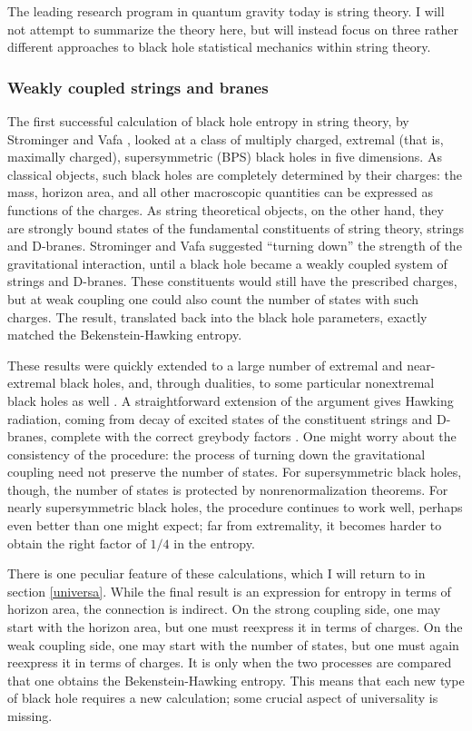 \documentclass[11pt]{article}
\begin{document}
The leading research program in quantum gravity today is string 
theory.  I will not attempt to summarize the theory here,
but will instead focus on three rather
different approaches to black hole statistical mechanics within
string theory.

\subsubsection{Weakly coupled strings and branes \label{weaka}}

The first successful calculation of black hole entropy in string theory,
by Strominger and Vafa \cite{StromVafa}, looked at a class of  multiply
charged, extremal (that is, maximally charged), supersymmetric (BPS)
black holes in five dimensions.  As classical objects, such black holes 
are completely determined by their charges: the mass, horizon area, 
and all other macroscopic quantities can be expressed as functions 
of the charges.  As string theoretical objects, on the other hand,
they are strongly bound states of the fundamental constituents of
string theory, strings and D-branes.  Strominger and Vafa suggested
``turning down'' the strength of the gravitational interaction, until
a black hole became a weakly coupled system of strings and 
D-branes.  These constituents would still have the prescribed charges, 
but at weak coupling one could also count the number of states with such
charges.  The result, translated back into the black hole parameters, 
exactly matched the Bekenstein-Hawking entropy.  

These results were quickly extended to a large number of extremal
and near-extremal black holes, and, through dualities, to some
particular nonextremal black holes as well \cite{Peet,Das}.
A straightforward extension of the argument gives Hawking radiation,
coming from decay of excited states of the constituent strings and 
D-branes, complete with the correct greybody factors \cite{Mal}.
One might worry about the consistency of the procedure: the 
process of turning down the gravitational coupling need not preserve 
the number of states.  For supersymmetric black holes, though, the
number of states is protected by nonrenormalization theorems.  
For nearly supersymmetric black holes, the procedure continues to
work well, perhaps even better than one might expect; far from 
extremality, it becomes harder to obtain the right factor of $1/4$ 
in the entropy.

There is one peculiar feature of these calculations, which I will return to
in section \ref{universa}.  While the final result is an expression for 
entropy in terms of horizon area, the connection is indirect.  On the
strong coupling side, one may start with the horizon area, but one
must reexpress it in terms of charges.  On the weak coupling side,
one may start with the number of states, but one must again reexpress
it in terms of charges.  It is only when the two processes are compared
that one obtains the Bekenstein-Hawking entropy.  This means that
each new type of black hole requires a new calculation; some crucial
aspect of universality is missing.
\end{document}
